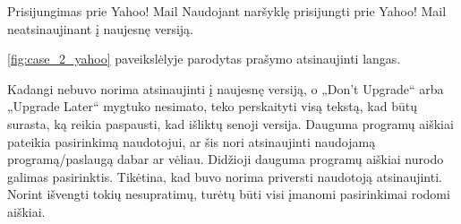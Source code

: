 ﻿\begin{xcase}{Prisijungimas prie Yahoo! Mail}
  \xcgoal
  {
    Naudojant naršyklę prisijungti prie Yahoo! Mail neatsinaujinant į naujesnę versiją.
  }
  \xctools
  {
    \ref{fig:case_2_yahoo} paveikslėlyje parodytas prašymo atsinaujinti langas.

  }
  \xcresult
  {
    Kadangi nebuvo norima atsinaujinti į naujesnę versiją, o „Don't Upgrade“ arba „Upgrade Later“ 
    mygtuko nesimato, teko perskaityti visą tekstą, kad būtų surasta, ką reikia paspausti, kad 
    išliktų senoji versija.
  }
  \xcprinciples
  {
    {
      Dauguma programų aiškiai pateikia pasirinkimą naudotojui, ar
      šis nori atsinaujinti naudojamą programą/paslaugą dabar ar
      vėliau.
    }
    {
      Didžioji dauguma programų aiškiai nurodo galimas pasirinktis.
    }
  }
  \xcthoughts
  {
    Tikėtina, kad buvo norima priversti naudotoją atsinaujinti. Norint
    išvengti tokių nesupratimų, turėtų būti visi įmanomi pasirinkimai 
    rodomi aiškiai.
  }
\end{xcase}

